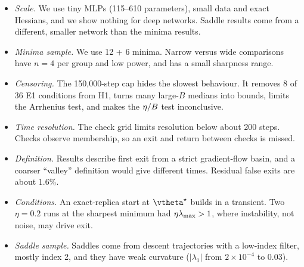 \begin{itemize}[leftmargin=*,itemsep=0pt,topsep=0pt]
    \item {\em Scale.} We use tiny MLPs (115--610 parameters), small data and exact Hessians, and we show nothing for deep networks. Saddle results come from a different, smaller network than the minima results.
    \item {\em Minima sample.} We use 12 + 6 minima. Narrow versus wide comparisons have $n=4$ per group and low power, and \digitsdata has a small sharpness range.
    \item {\em Censoring.} The 150,000-step cap hides the slowest behaviour. It removes 8 of 36 E1 conditions from H1, turns many large-$B$ medians into bounds, limits the Arrhenius test, and makes the \digitsdata $\eta/B$ test inconclusive.
    \item {\em Time resolution.} The check grid limits resolution below about 200 steps. Checks observe membership, so an exit and return between checks is missed.
    \item {\em Definition.} Results describe first exit from a strict gradient-flow basin, and a coarser ``valley'' definition would give different times. Residual false exits are about 1.6\%.
    \item {\em Conditions.} An exact-replica start at $\tstar$ builds in a transient. Two $\eta=0.2$ runs at the sharpest minimum had $\eta\lambda_{\max}>1$, where instability, not noise, may drive exit.
    \item {\em Saddle sample.} Saddles come from descent trajectories with a low-index filter, mostly index 2, and they have weak curvature ($|\lambda_1|$ from $2\times10^{-4}$ to 0.03).
\end{itemize}
